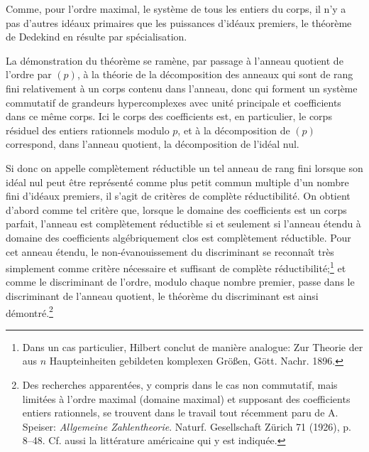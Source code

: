 Comme, pour l'ordre maximal, le système de tous les entiers du corps, il n'y a pas d'autres idéaux primaires que les puissances d'idéaux premiers, le théorème de Dedekind en résulte par spécialisation.

La démonstration du théorème se ramène, par passage à l'anneau quotient de l'ordre par $(p)$, à la théorie de la décomposition des anneaux qui sont de rang fini relativement à un corps contenu dans l'anneau, donc qui forment un système commutatif de grandeurs hypercomplexes avec unité principale et coefficients dans ce même corps. Ici le corps des coefficients est, en particulier, le corps résiduel des entiers rationnels modulo $p$, et à la décomposition de $(p)$ correspond, dans l'anneau quotient, la décomposition de l'idéal nul.

Si donc on appelle complètement réductible un tel anneau de rang fini lorsque son idéal nul peut être représenté comme plus petit commun multiple d'un nombre fini d'idéaux premiers, il s'agit de critères de complète réductibilité. On obtient d'abord comme tel critère que, lorsque le domaine des coefficients est un corps parfait, l'anneau est complètement réductible si et seulement si l'anneau étendu à domaine des coefficients algébriquement clos est complètement réductible. Pour cet anneau étendu, le non-évanouissement du discriminant se reconnaît très simplement comme critère nécessaire et suffisant de complète réductibilité;\footnote{Dans un cas particulier, Hilbert conclut de manière analogue: Zur Theorie der aus $n$ Haupteinheiten gebildeten komplexen Größen, Gött. Nachr. 1896.} et comme le discriminant de l'ordre, modulo chaque nombre premier, passe dans le discriminant de l'anneau quotient, le théorème du discriminant est ainsi démontré.\footnote{Des recherches apparentées, y compris dans le cas non commutatif, mais limitées à l'ordre maximal (domaine maximal) et supposant des coefficients entiers rationnels, se trouvent dans le travail tout récemment paru de A. Speiser: \emph{Allgemeine Zahlentheorie}. Naturf. Gesellschaft Zürich 71 (1926), p. 8--48. Cf. aussi la littérature américaine qui y est indiquée.}

